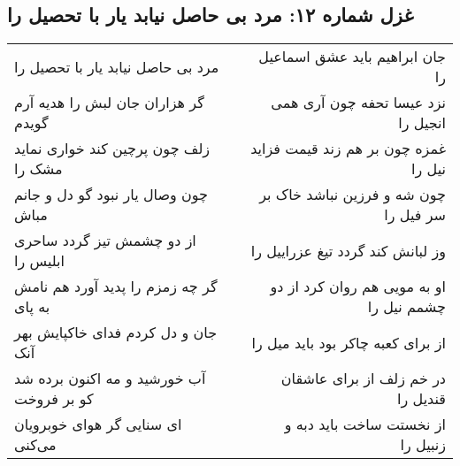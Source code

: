 \begin{center}
\section*{غزل شماره ۱۲: مرد بی حاصل نیابد یار با تحصیل را}
\label{sec:012}
\begin{longtable}{l p{0.5cm} r}
مرد بی حاصل نیابد یار با تحصیل را
&&
جان ابراهیم باید عشق اسماعیل را
\\
گر هزاران جان لبش را هدیه آرم گویدم
&&
نزد عیسا تحفه چون آری همی انجیل را
\\
زلف چون پرچین کند خواری نماید مشک را
&&
غمزه چون بر هم زند قیمت فزاید نیل را
\\
چون وصال یار نبود گو دل و جانم مباش
&&
چون شه و فرزین نباشد خاک بر سر فیل را
\\
از دو چشمش تیز گردد ساحری ابلیس را
&&
وز لبانش کند گردد تیغ عزراییل را
\\
گر چه زمزم را پدید آورد هم نامش به پای
&&
او به مویی هم روان کرد از دو چشمم نیل را
\\
جان و دل کردم فدای خاکپایش بهر آنک
&&
از برای کعبه چاکر بود باید میل را
\\
آب خورشید و مه اکنون برده شد کو بر فروخت
&&
در خم زلف از برای عاشقان قندیل را
\\
ای سنایی گر هوای خوبرویان می‌کنی
&&
از نخستت ساخت باید دبه و زنبیل را
\\
\end{longtable}
\end{center}
